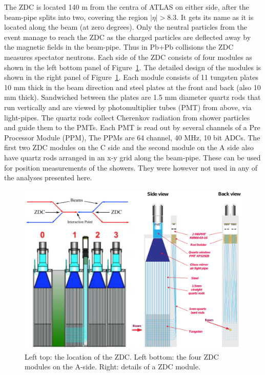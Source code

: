 The ZDC is located 140 m from the centra of ATLAS on either side, after the beam-pipe splits into two, covering the region $|\eta|>8.3$. It gets its name as it is located along the beam (at zero degrees). Only the neutral particles from the event manage to reach the ZDC as the charged particles are deflected away by the magnetic fields in the beam-pipe. Thus in Pb+Pb collisions the ZDC measures spectator neutrons. Each side of the ZDC consists of four modules as shown in the left bottom panel of Figure~\ref{fig:detector_ATLAS_ZDC}. The detailed design of the modules is shown in the right panel of Figure~\ref{fig:detector_ATLAS_ZDC}. Each module consists of 11 tungsten plates 10 mm thick in the beam direction and steel plates at the front and back (also 10 mm thick). Sandwiched between the plates are 1.5 mm diameter quartz rods that run vertically and are viewed by photomultiplier tubes (PMT) from above, via light-pipes. The quartz rods collect Cherenkov radiation from shower particles and guide them to the PMTs. Each PMT is read out by several channels of a Pre Processor Module (PPM), The PPMs are 64 channel, 40 MHz, 10 bit ADCs. The first two ZDC modules on the C side and the second module on the A side also have quartz rods arranged in an x-y grid along the beam-pipe. These can be used for position measurements of the showers. They were however not used in any of the analyses presented here. 

\begin{figure}[H]
\centering
\includegraphics[width=.95\linewidth]{figs/chapter_detector/ATLAS_ZDC.png}
\caption{Left top: the location of the ZDC. Left bottom: the four ZDC modules on the A-side. Right: details of a ZDC module.}
\label{fig:detector_ATLAS_ZDC}
\end{figure}


